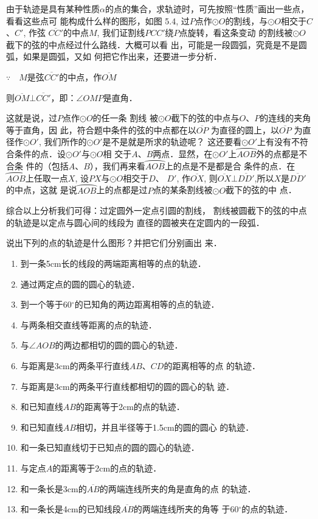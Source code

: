 \begin{solution}
    由于轨迹是具有某种性质$\alpha$的点的集合，求轨迹时，可先按照“性质”画出一些点，看看这些点可
能构成什么样的图形，如图
5.4, 过$P$点作$\odot O$的割线，与$\odot O$相交于$C$、$C'$, 作弦
$\overline{CC'}$的中点$M$, 我们证割线$PCC'$绕$P$点旋转，看这条变动
的割线被$\odot O$截下的弦的中点经过什么路线．大概可以看
出，可能是一段圆弧，究竟是不是圆弧，如果是圆弧，又如
何把它作出来，还要进一步分析．

$\because\quad M$是弦$\overline{CC'}$的中点，作$\overline{OM}$

则$\overline{OM}\bot\overline{CC'}$，即：$\angle OMP$是直角．

这就是说，过$P$点作$\odot O$的任一条 割线
被$\odot O$截下的弦的中点与$O$、$P$的连线的夹角等于直角，因
此，符合题中条件的弦的中点都在以$\overline{OP}$
为直径的圆上，以$\overline{OP}$
为直径作$\odot O'$, 我们所作的$\odot O'$是不是就是所求的轨迹呢？
这还要看$\odot O'$上有没有不符合条件的点．设$\odot O'$与$\odot O$相
交于$A$、$B$两点．显然，在$\odot O'$上$\wideparen{AOB}$外的点都是不合条
件的（包括$A$、$B$），我们再来看$\wideparen{AOB}$上的点是不是都是合
条件的点．在
$\wideparen{AOB}$上任取一点$X$, 设$PX$与$\odot O$相交于$D$、
$D'$, 作$\overline{OX}$, 则$\overline{OX}\bot \overline{DD'}$,所以$X$是$\overline{DD'}$的中点，这就
是说$\wideparen{AOB}$上的点都是过$P$点的某条割线被$\odot O$截下的弦的中
点．
\end{solution}

综合以上分析我们可得：过定圆外一定点引圆的割线，
割线被圆截下的弦的中点的轨迹是以定点与圆心间的线段为
直径的圆被夹在定圆内的一段弧．

\begin{ex}
    说出下列的点的轨迹是什么图形？并把它们分别画出
来．
\begin{enumerate}
    \item 到一条5cm长的线段的两端距离相等的点的轨迹．
    \item 通过两定点的圆的圆心的轨迹．
    \item 到一个等于60$^{\circ}$的已知角的两边距离相等的点的轨迹．
    \item 与两条相交直线等距离的点的轨迹．
    \item 与$\angle AOB$的两边都相切的圆的圆心的轨迹．
    \item 与距离是3cm的两条平行直线$AB$、$CD$的距离相等的点
的轨迹．
\item 与距离是3cm的两条平行直线都相切的圆的圆心的轨
迹．
\item 和已知直线$AB$的距离等于2cm的点的轨迹．
\item 和已知直线$AB$相切，并且半径等于1.5cm的圆的圆心
的轨迹．
   \item 和一条已知直线切于已知点的圆的圆心的轨迹．
\item 与定点$A$的距离等于2cm的点的轨迹．
\item 和一条长是3cm的$\overline{AB}$的两端连线所夹的角是直角的点
的轨迹．
\item 和一条长是4cm的已知线段$\overline{AB}$的两端连线所夹的角等
于60$^{\circ}$的点的轨迹．

\end{enumerate}
\end{ex}


